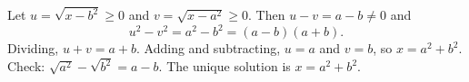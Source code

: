Let $u=\sqrt{x-b^2}\ge0$ and $v=\sqrt{x-a^2}\ge0$. Then $u-v=a-b\ne0$ and
\[u^2-v^2=a^2-b^2=(a-b)(a+b).\]
Dividing, $u+v=a+b$. Adding and subtracting, $u=a$ and $v=b$, so $x=a^2+b^2$. Check: $\sqrt{a^2}-\sqrt{b^2}=a-b$. The unique solution is $\boxed{x=a^2+b^2}$.

